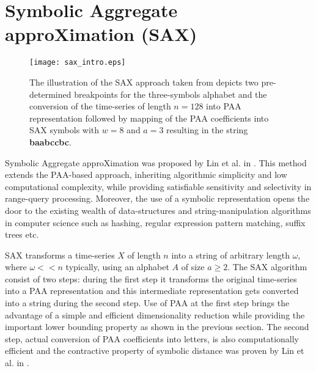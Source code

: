 \section{Symbolic Aggregate approXimation (SAX)} \label{sax}
\begin{figure}[tbp]
   \centering
   \texttt{[image: sax\_intro.eps]}
   \caption{The illustration of the SAX approach taken from \cite{citeulike:2821475} depicts two pre-determined breakpoints for the three-symbols alphabet and the conversion of the time-series of length $n=128$ into PAA representation followed by mapping of the PAA coefficients into SAX symbols with $w=8$ and $a=3$ resulting in the string \textbf{baabccbc}.}
   \label{fig:sax_intro}
\end{figure}

Symbolic Aggregate approXimation was proposed by Lin et al. in \cite{citeulike:2821475}. This method extends the PAA-based approach, inheriting algorithmic simplicity and low computational complexity, while providing satisfiable sensitivity and selectivity in range-query processing. Moreover, the use of a symbolic representation opens the door to the existing wealth of data-structures and string-manipulation algorithms in computer science such as hashing, regular expression pattern matching, suffix trees etc.

SAX transforms a time-series $X$ of length $n$ into a string of arbitrary length $\omega$, where $\omega << n$ typically, using an alphabet $A$ of size $ a \geq 2$. The SAX algorithm consist of two steps: during the first step it transforms the original time-series into a PAA representation and this intermediate representation gets converted into a string during the second step. Use of PAA at the first step brings the advantage of a simple and efficient dimensionality reduction while providing the important lower bounding property as shown in the previous section. The second step, actual conversion of PAA coefficients into letters, is also computationally efficient and the contractive property of symbolic distance was proven by Lin et al. in \cite{citeulike:532335}.

